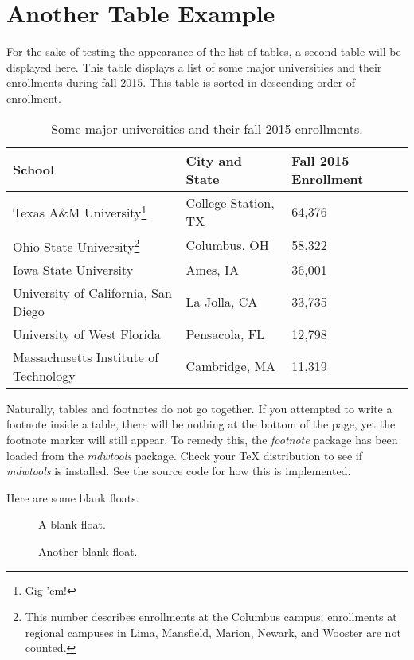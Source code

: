 \section{Another Table Example}
For the sake of testing the appearance of the list of tables, a second table will be displayed here. This table displays a list of some major universities and their enrollments during fall 2015. This table is sorted in descending order of enrollment.
\begin{savenotes}
\begin{table}[h!]
	\centering
	\label{my-label}
	\begin{tabular}{|l|l|l|}
		\hline
		School & City and State & Fall 2015 Enrollment  \\ \hline
		Texas A\&M University\footnote{Gig 'em!} & College Station, TX & 64,376  \\ \hline
		Ohio State University\footnote{This number describes enrollments at the Columbus campus; enrollments at regional campuses in Lima, Mansfield, Marion, Newark, and Wooster are not counted.} & Columbus, OH & 58,322 \\ \hline
		Iowa State University & Ames, IA & 36,001 \\ \hline
		University of California, San Diego & La Jolla, CA & 33,735   \\ \hline
		University of West Florida & Pensacola, FL & 12,798 \\ \hline
		Massachusetts Institute of Technology & Cambridge, MA & 11,319   \\ \hline
	\end{tabular}
	\caption{Some major universities and their fall 2015 enrollments.}
\end{table}
\end{savenotes}

Naturally, tables and footnotes do not go together. If you attempted to write a footnote inside a table, there will be nothing at the bottom of the page, yet the footnote marker will still appear. To remedy this, the \textit{footnote} package has been loaded from the \textit{mdwtools} package. Check your TeX distribution to see if \textit{mdwtools} is installed. See the source code for how this is implemented.

Here are some blank floats.

\begin{figure}[!h]
	\caption{A blank float.}
\end{figure}

\begin{figure}[!h]
	\caption{Another blank float.}
\end{figure}